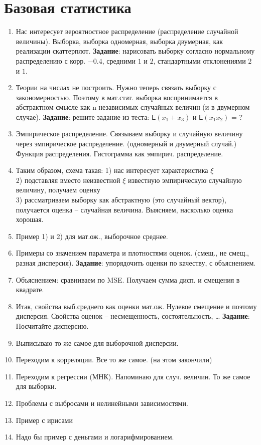 \section{Базовая статистика}

\begin{enumerate}
\item Нас интересует вероятностное распределение (распределение случайной величины). Выборка, выборка одномерная, выборка двумерная, как реализации скаттерплот. \textbf{Задание}: нарисовать выборку согласно нормальному распределению с корр. $-0.4$, средними $1$ и $2$, стандартными отклонениями $2$ и $1$.
\item	Теории на числах не построить. Нужно теперь связать выборку с закономерностью. Поэтому в мат.стат. выборка воспринимается в абстрактном смысле как n независимых случайных величин (и в двумерном случае). \textbf{Задание}: решите задание из теста:  $\textsf{E}(x_1+x_3)$ и $\textsf{E}(x_1 x_2)$ = ?
\item	Эмпирическое распределение. Связываем выборку и случайную величину через эмпирическое распределение. (одномерный и двумерный случай.)
Функция распределения. Гистограмма как эмпирич. распределение.
\item	Таким образом, схема такая:
1) нас интересует характеристика $\xi$\\
2) подставляя вместо неизвестной $\xi$ известную эмпирическую случайную величину, получаем оценку\\
3) рассматриваем выборку как абстрактную (это случайный вектор), получается оценка – случайная величина. Выясняем, насколько оценка хорошая.
\item	Пример 1) и 2) для мат.ож., выборочное среднее. 
\item	Примеры со значением параметра и плотностями оценок. (смещ., не смещ., разная дисперсия). \textbf{Задание}: упорядочить оценки по качеству, с объяснением.
\item	Объяснением: сравниваем по MSE. Получаем сумма дисп. и смещения в квадрате.
\item	Итак, свойства выб.среднего как оценки мат.ож. Нулевое смещение и поэтому дисперсия. Свойства оценок – несмещенность, состоятельность, …  \textbf{Задание}: Посчитайте дисперсию.
\item	Выписываю то же самое для выборочной дисперсии.
\item	Переходим к корреляции. Все то же самое. (на этом закончили)
\item	Переходим к регрессии (МНК). Напоминаю для случ. величин. То же самое для выборки.
\item	Проблемы с выбросами и нелинейными зависимостями.
\item	Пример с ирисами
\item	Надо бы пример с деньгами и логарифмированием.
\end{enumerate}
